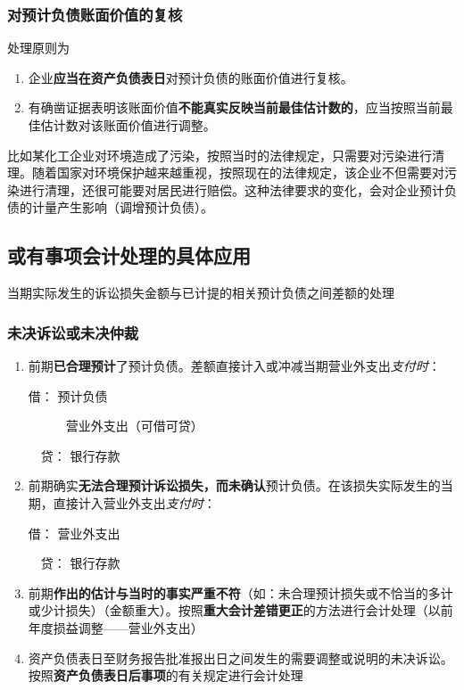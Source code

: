 \documentclass[UTF8,12pt]{ctexart}
\newenvironment{Dr}{\noindent 借：}{\par}
\newenvironment{Cr}{\noindent \ \ 贷：}{\par}
\numberwithin{equation}{section} %
\numberwithin{figure}{section}
\numberwithin{table}{section}
\begin{document}
	
	\subsubsection{对预计负债账面价值的复核}
	处理原则为
	\begin{enumerate}
		\item 企业\textbf{应当在资产负债表日}对预计负债的账面价值进行复核。
		
		\item 有确凿证据表明该账面价值\textbf{不能真实反映当前最佳估计数的}，应当按照当前最佳估计数对该账面价值进行调整。
	\end{enumerate}
	
	比如某化工企业对环境造成了污染，按照当时的法律规定，只需要对污染进行清理。随着国家对环境保护越来越重视，按照现在的法律规定，该企业不但需要对污染进行清理，还很可能要对居民进行赔偿。这种法律要求的变化，会对企业预计负债的计量产生影响（调增预计负债）。
	
	\subsection{或有事项会计处理的具体应用}
	当期实际发生的诉讼损失金额与已计提的相关预计负债之间差额的处理
	
	\subsubsection{未决诉讼或未决仲裁}
	\begin{enumerate}
		\item 前期\textbf{已合理预计}了预计负债。差额直接计入或冲减当期营业外支出\textit{支付时}：
		
		\begin{Dr}
			预计负债
			
			\ \ \ \ \ \ 营业外支出（可借可贷） 
		\end{Dr}
		\begin{Cr}
			银行存款
		\end{Cr}
		
		\item 前期确实\textbf{无法合理预计诉讼损失，而未确认}预计负债。在该损失实际发生的当期，直接计入营业外支出\textit{支付时}：
		
		\begin{Dr}
			营业外支出
		\end{Dr}
		\begin{Cr}
			银行存款
		\end{Cr}
		
		
		\item 前期\textbf{作出的估计与当时的事实严重不符}（如：未合理预计损失或不恰当的多计或少计损失）（金额重大）。按照\textbf{重大会计差错更正}的方法进行会计处理（以前年度损益调整——营业外支出）
		
		
		\item 资产负债表日至财务报告批准报出日之间发生的需要调整或说明的未决诉讼。按照\textbf{资产负债表日后事项}的有关规定进行会计处理
	\end{enumerate}
\end{document}
